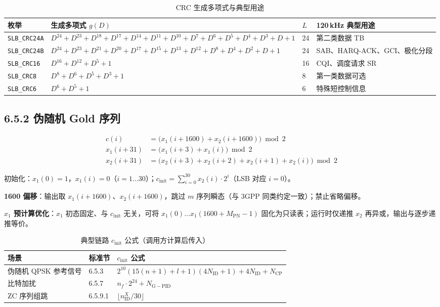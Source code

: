 \documentclass[11pt,a4paper]{ctexart}
\begin{document}
\begin{longtable}{L{2.6cm}L{7.2cm}L{1.2cm}L{3.2cm}}
\caption{CRC 生成多项式与典型用途\label{tab:6513-crc-poly}} \\
\toprule
\textbf{枚举} & \textbf{生成多项式 $g(D)$} & \textbf{$L$} & \textbf{120\,kHz 典型用途} \\
\midrule
\texttt{SLB\_CRC24A} &
$D^{24}{+}D^{23}{+}D^{18}{+}D^{17}{+}D^{14}{+}D^{11}{+}D^{10}{+}D^{7}{+}D^{6}{+}D^{5}{+}D^{4}{+}D^{3}{+}D{+}1$ &
24 & 第二类数据 TB \\
\texttt{SLB\_CRC24B} &
$D^{24}{+}D^{23}{+}D^{21}{+}D^{20}{+}D^{17}{+}D^{15}{+}D^{13}{+}D^{12}{+}D^{8}{+}D^{4}{+}D^{2}{+}D{+}1$ &
24 & SAB、HARQ-ACK、GCI、极化分段 \\
\texttt{SLB\_CRC16} & $D^{16}{+}D^{12}{+}D^{5}{+}1$ & 16 & CQI、调度请求 SR \\
\texttt{SLB\_CRC8} & $D^{8}{+}D^{6}{+}D^{5}{+}D^{3}{+}1$ & 8 & 第一类数据可选 \\
\texttt{SLB\_CRC6} & $D^{6}{+}D^{5}{+}1$ & 6 & 特殊短控制信息 \\
\bottomrule
\end{longtable}

\subsection{6.5.2 伪随机 Gold 序列}

\begin{align}
c(i) &= \bigl(x_1(i{+}1600) + x_2(i{+}1600)\bigr) \bmod 2 \\
x_1(i{+}31) &= \bigl(x_1(i{+}3) + x_1(i)\bigr) \bmod 2 \\
x_2(i{+}31) &= \bigl(x_2(i{+}3) + x_2(i{+}2) + x_2(i{+}1) + x_2(i)\bigr) \bmod 2
\end{align}

初始化：$x_1(0){=}1$，$x_1(i){=}0$（$i{=}1\ldots 30$）；$c_{\mathrm{init}}=\sum_{i=0}^{30} x_2(i)\cdot 2^i$（LSB 对应 $i{=}0$）。

\textbf{1600 偏移}：输出取 $x_1(i{+}1600)$、$x_2(i{+}1600)$，跳过 $m$ 序列瞬态（与 3GPP 同类约定一致）；禁止省略偏移。

\textbf{$x_1$ 预计算优化}：$x_1$ 初态固定、与 $c_{\mathrm{init}}$ 无关，可将 $x_1(0)\ldots x_1(1600{+}M_{\mathrm{PN}}{-}1)$ 固化为只读表；运行时仅递推 $x_2$ 再异或，输出与逐步递推等价。

\begin{longtable}{L{4.5cm}L{2.2cm}L{7.5cm}}
\caption{典型链路 $c_{\mathrm{init}}$ 公式（调用方计算后传入）\label{tab:6513-cinit}} \\
\toprule
\textbf{场景} & \textbf{标准节} & \textbf{$c_{\mathrm{init}}$ 公式} \\
\midrule
伪随机 QPSK 参考信号 & 6.5.3 &
$2^{10}(15(n{+}1){+}l{+}1)(4N_{\mathrm{ID}}{+}1){+}4N_{\mathrm{ID}}{+}N_{\mathrm{CP}}$ \\
比特加扰 & 6.5.7 & $n_f\cdot 2^{24} + N_{\mathrm{G-PID}}$ \\
ZC 序列组跳 & 6.5.9.1 & $\lfloor n_{\mathrm{ID}}^X / 30\rfloor$ \\
\bottomrule
\end{longtable}
\end{document}
